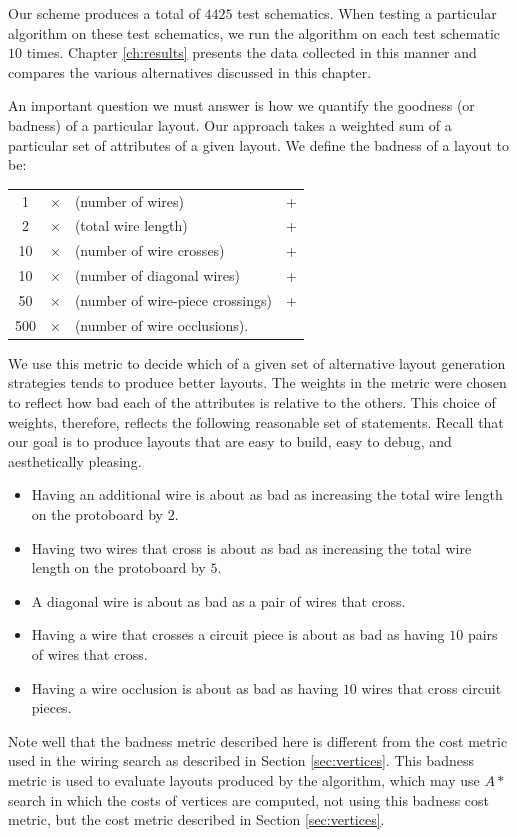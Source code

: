 Our scheme produces a total of $4425$ test schematics.
When testing a particular algorithm on these test
schematics, we run the algorithm on each test schematic $10$ times. Chapter
\ref{ch:results} presents the data collected in this manner and compares the
various alternatives discussed in this chapter.

An important question we must answer is how we quantify the goodness (or badness)
of a particular layout. Our approach takes a weighted sum of a particular set of
attributes of a given layout. We define the badness of a layout to be:
\begin{table}[H]
\centering
\begin{tabular}{ccll}
1 &$\times$ &(number of wires) &+ \\
2 &$\times$ &(total wire length) &+ \\
10 &$\times$ &(number of wire crosses) &+ \\
10 &$\times$ &(number of diagonal wires) &+ \\
50 &$\times$ &(number of wire-piece crossings) &+ \\
500 &$\times$ &(number of wire occlusions).
\end{tabular}
\end{table}
We use this metric to decide which of a given set of alternative
layout generation strategies tends to produce better layouts.
The weights in the metric were chosen to reflect how
bad each of the attributes is relative to the others. This choice of weights,
therefore, reflects the following reasonable set of statements. Recall that our
goal is to produce layouts that are easy to build, easy to debug, and
aesthetically pleasing.
\begin{itemize}
\item Having an additional wire is about as bad as increasing the total wire
length on the protoboard by $2$.
\item Having two wires that cross is about as bad as increasing the total
wire length on the protoboard by $5$.
\item A diagonal wire is about as bad as a pair of wires that cross.
\item Having a wire that crosses a circuit piece is about as bad as having $10$
pairs of wires that cross.
\item Having a wire occlusion is about as bad as having $10$ wires that cross
circuit pieces.
\end{itemize}

Note well that the badness metric described here is different from the cost
metric used in the wiring search as described in Section \ref{sec:vertices}.
This badness metric is used to evaluate layouts produced by the algorithm,
which may use $A*$ search in which the costs of vertices are computed, not using
this badness cost metric, but the cost metric described in Section
\ref{sec:vertices}.
